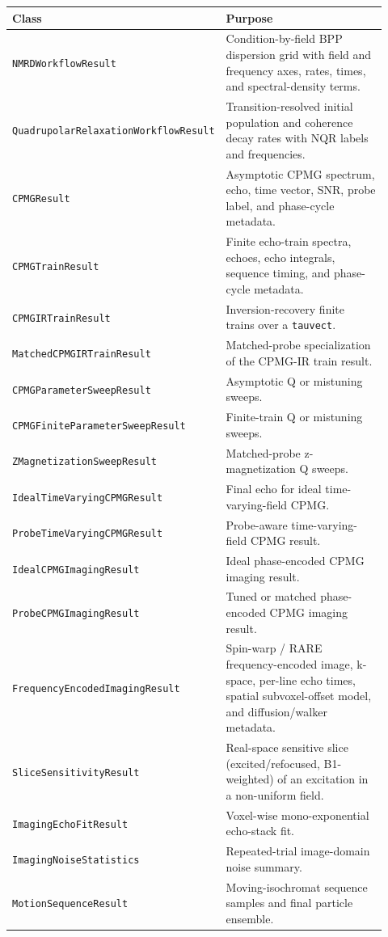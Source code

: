 \documentclass[11pt,oneside]{report}
\newcommand{\code}[1]{\texttt{#1}}
\begin{document}
\begin{longtable}{p{0.43\linewidth}p{0.49\linewidth}}
\toprule
Class & Purpose \\
\midrule
\code{NMRDWorkflowResult} & Condition-by-field BPP dispersion grid with field and frequency axes, rates, times, and spectral-density terms. \\
\code{QuadrupolarRelaxationWorkflowResult} & Transition-resolved initial population and coherence decay rates with NQR labels and frequencies. \\
\code{CPMGResult} & Asymptotic CPMG spectrum, echo, time vector, SNR, probe label, and phase-cycle metadata. \\
\code{CPMGTrainResult} & Finite echo-train spectra, echoes, echo integrals, sequence timing, and phase-cycle metadata. \\
\code{CPMGIRTrainResult} & Inversion-recovery finite trains over a \code{tauvect}. \\
\code{MatchedCPMGIRTrainResult} & Matched-probe specialization of the CPMG-IR train result. \\
\code{CPMGParameterSweepResult} & Asymptotic Q or mistuning sweeps. \\
\code{CPMGFiniteParameterSweepResult} & Finite-train Q or mistuning sweeps. \\
\code{ZMagnetizationSweepResult} & Matched-probe z-magnetization Q sweeps. \\
\code{IdealTimeVaryingCPMGResult} & Final echo for ideal time-varying-field CPMG. \\
\code{ProbeTimeVaryingCPMGResult} & Probe-aware time-varying-field CPMG result. \\
\code{IdealCPMGImagingResult} & Ideal phase-encoded CPMG imaging result. \\
\code{ProbeCPMGImagingResult} & Tuned or matched phase-encoded CPMG imaging result. \\
\code{FrequencyEncodedImagingResult} & Spin-warp / RARE frequency-encoded image, k-space, per-line echo times, spatial subvoxel-offset model, and diffusion/walker metadata. \\
\code{SliceSensitivityResult} & Real-space sensitive slice (excited/refocused, B1-weighted) of an excitation in a non-uniform field. \\
\code{ImagingEchoFitResult} & Voxel-wise mono-exponential echo-stack fit. \\
\code{ImagingNoiseStatistics} & Repeated-trial image-domain noise summary. \\
\code{MotionSequenceResult} & Moving-isochromat sequence samples and final particle ensemble. \\

\end{longtable}
\end{document}
